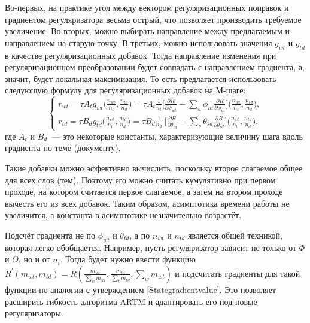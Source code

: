 \documentclass[12pt, twoside]{article}
\begin{document}
Во-первых, на практике угол между вектором регуляризационных поправок и градиентом регуляризатора весьма острый, что позволяет производить требуемое увеличение. Во-вторых, можно выбирать направление между предлагаемым  и направлением на старую точку. В третьих, можно использовать значения $g_{wt}$ и $g_{td}$ в качестве регуляризационных добавок. Тогда направление изменения при регуляризационном преобразовании будет совпадать с направлением градиента, а, значит, будет локальная максимизация. То есть предлагается использовать следующую формулу для регуляризационных добавок на М-шаге:
\begin{equation}
\label{artm_gradient}
\left\{
	\begin{aligned}
		r_{wt} = \tau A_t g_{wt}\bigg(\frac{n_{wt}}{n_t}, \frac{n_{td}}{n_d}\bigg) = \tau A_t \frac{1}{n_t} \bigg[{\frac{\partial{R}}{\partial{\phi_{wt}}} - \sum\limits_u \phi_{ut} \frac{\partial{R}}{\partial{\phi_{ut}}} }\bigg] \bigg(\frac{n_{wt}}{n_t}, \frac{n_{td}}{n_d}\bigg),\\
		r_{td} = \tau B_d g_{td} \bigg(\frac{n_{wt}}{n_t}, \frac{n_{td}}{n_d}\bigg) = \tau B_d \frac{1}{n_d} \ \bigg[ {\frac{\partial{R}}{\partial{\theta_{td}}} - \sum\limits_s \theta_{sd} \frac{\partial{R}}{\partial{\theta_{sd}}} }\bigg] \bigg(\frac{n_{wt}}{n_t}, \frac{n_{td}}{n_d}\bigg) ,
	\end{aligned}
\right.
\end{equation}
где $A_t$ и $B_d$~--- это некоторые константы, характеризующие величину шага вдоль градиента по теме (документу).

Такие добавки можно эффективно вычислить, поскольку второе слагаемое общее для всех слов (тем). Поэтому его можно считать кумулятивно при первом проходе, на котором считается первое слагаемое, а затем на втором проходе вычесть его из всех добавок. Таким образом, асимптотика времени работы не увеличится, а константа в асимптотике незначительно возрастёт.

Подсчёт градиента не по $\phi_{wt}$ и $\theta_{td}$, а по $n_{wt}$ и $n_{td}$ является общей техникой, которая легко обобщается. Например, пусть регуляризатор зависит не только от $\Phi$ и $\Theta$, но и от $n_t$. Тогда будет нужно ввести функцию $R^{\prime}(m_{wt}, m_{td}) = R\left( \frac{m_{wt}}{\sum\limits_w m_{wt}},  \frac{m_{td}}{\sum\limits_t m_{td}}, \sum\limits_w m_{wt}\right)$ и подсчитать градиенты для такой функции по аналогии с утверждением \ref{Stategradientvalue}. Это позволяет расширить гибкость алгоритма ARTM и адаптировать его под новые регуляризаторы.
\end{document}
